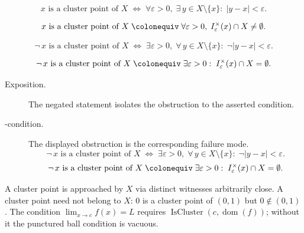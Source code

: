 \begin{remark*}
\[
  x\text{ is a cluster point of }X
  \;\iff\;
  \forall\varepsilon > 0,\;
  \exists\, y \in X \setminus \{x\} :\;
  |y - x| < \varepsilon.
\]
\end{remark*}

\begin{remark*}
\[
  x\text{ is a cluster point of }X
  \;\colonequiv\;
  \forall\varepsilon > 0,\;
  I_\varepsilon^\times(x) \cap X \neq \emptyset.
\]
\end{remark*}

\begin{remark*}
\[
  \neg\,x\text{ is a cluster point of }X
  \;\iff\;
  \exists\varepsilon > 0,\;
  \forall\, y \in X \setminus \{x\} :\;
  \neg|y-x|<\varepsilon.
\]
\end{remark*}

\begin{remark*}
\[
  \neg\,x\text{ is a cluster point of }X
  \;\colonequiv\;
  \exists\varepsilon > 0 :\;
  I_\varepsilon^\times(x) \cap X = \emptyset.
\]
\end{remark*}

\begin{remark*}
\begin{description}
  \item[Exposition.]
  The negated statement isolates the obstruction to the asserted condition.

  \item[\exists-condition.]
  The displayed obstruction is the corresponding failure mode.
  \[
  \neg\,x\text{ is a cluster point of }X
  \;\iff\;
  \exists\varepsilon > 0,\;
  \forall\, y \in X \setminus \{x\} :\;
  \neg|y-x|<\varepsilon.
\]
  \[
  \neg\,x\text{ is a cluster point of }X
  \;\colonequiv\;
  \exists\varepsilon > 0 :\;
  I_\varepsilon^\times(x) \cap X = \emptyset.
\]
\end{description}
\end{remark*}



\begin{remark*}[Interpretation]
A cluster point is approached by $X$ via distinct witnesses
arbitrarily close. A cluster point need not belong to $X$: $0$ is
a cluster point of $(0,1)$ but $0 \notin (0,1)$. The condition
$\lim_{x\to c}f(x)=L$ requires
$\operatorname{IsCluster}(c, \operatorname{dom}(f))$; without
it the punctured ball condition is vacuous.
\end{remark*}

